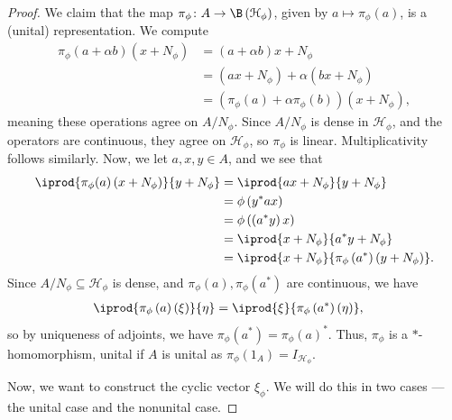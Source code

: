 \documentclass[10pt]{mypackage}
\begin{document}
\begin{proof}
  We claim that the map $\pi_{\phi}\colon A\rightarrow \B\left(\mathcal{H}_{\phi}\right)$, given by $a\mapsto \pi_{\phi}(a)$, is a (unital) representation. We compute
  \begin{align*}
    \pi_{\phi}\left(a + \alpha b\right)\left(x + N_{\phi}\right) &= \left(a + \alpha b\right)x + N_{\phi}\\
                                                                 &= \left(ax + N_{\phi}\right) + \alpha\left(bx + N_{\phi}\right)\\
                                                                 &= \left(\pi_{\phi}\left(a\right)+ \alpha \pi_{\phi}\left(b\right)\right)\left(x + N_{\phi}\right),
  \end{align*}
  meaning these operations agree on $A/N_{\phi}$. Since $A/N_{\phi}$ is dense in $\mathcal{H}_{\phi}$, and the operators are continuous, they agree on $\mathcal{H}_{\phi}$, so $\pi_{\phi}$ is linear. Multiplicativity follows similarly. Now, we let $a,x,y\in A$, and we see that
  \begin{align*}
    \iprod{\pi_{\phi}(a)\left(x + N_{\phi}\right)}{y + N_{\phi}} &= \iprod{ax + N_{\phi}}{y + N_{\phi}}\\
                                                         &= \phi\left(y^{\ast}ax\right)\\
                                                         &= \phi\left(\left(a^{\ast}y\right)x\right)\\
                                                         &= \iprod{x + N_{\phi}}{a^{\ast}y + N_{\phi}}\\
                                                       &= \iprod{x + N_{\phi}}{\pi_{\phi}\left(a^{\ast}\right)\left(y + N_{\phi}\right)}.
  \end{align*}
  Since $A/N_{\phi}\subseteq \mathcal{H}_{\phi}$ is dense, and $\pi_{\phi}(a),\pi_{\phi}\left(a^{\ast}\right)$ are continuous, we have
  \begin{align*}
    \iprod{\pi_{\phi}\left(a\right)\left(\xi\right)}{\eta} &= \iprod{\xi}{\pi_{\phi}\left(a^{\ast}\right)\left(\eta\right)},
  \end{align*}
  so by uniqueness of adjoints, we have $\pi_{\phi}\left(a^{\ast}\right) = \pi_{\phi}\left(a\right)^{\ast}$. Thus, $\pi_{\phi}$ is a $\ast$-homomorphism, unital if $A$ is unital as $\pi_{\phi}\left(1_A\right) = I_{\mathcal{H}_{\phi}}$.\newline

  Now, we want to construct the cyclic vector $\xi_{\phi}$. We will do this in two cases --- the unital case and the nonunital case.\newline


\end{proof}
\end{document}

